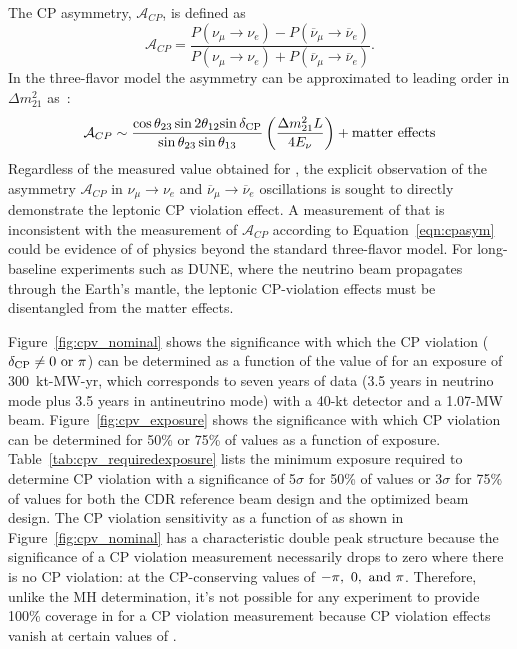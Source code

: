 The CP asymmetry,
$\mathcal{A}_{CP}$, is defined as 
\begin{equation}
\label{eqn:cp-asymm}
 \mathcal{A}_{CP} = \frac{P(\nu_\mu \rightarrow \nu_e) -
  P(\overline{\nu}_\mu \rightarrow \overline{\nu}_e)}{P(\nu_\mu \rightarrow
  \nu_e) + P(\overline{\nu}_\mu \rightarrow \overline{\nu}_e)}.
\end{equation}
In the three-flavor model the asymmetry can be approximated to leading
order in $\Delta m_{21}^2$ as~\cite{Marciano:2006uc}:
\begin{equation}
\mathcal{A}_{CP} \sim \frac{\cos \theta_{23} \sin 2 \theta_{12}
  {\sin \mdeltacp}}{\sin \theta_{23} \sin \theta_{13}}
\left(\frac{\Delta m^2_{21} L}{ 4 E_{\nu}}\right) + {\rm matter
  \ effects}
\label{eqn:cpasym}
\end{equation}
Regardless of the measured value obtained for \deltacp, the explicit observation
of the asymmetry $\mathcal{A}_{CP}$ in $\nu_{\mu} \rightarrow \nu_e$ and $\overline{\nu}_{\mu} \rightarrow \overline{\nu}_e$
oscillations is sought to directly demonstrate the
leptonic CP violation effect.  A measurement of \deltacp that is inconsistent with the measurement of $\mathcal{A}_{CP}$
according to Equation~\ref{eqn:cpasym} could be evidence of of physics beyond the standard three-flavor model.
For long-baseline experiments such as DUNE, where the neutrino beam propagates through 
the Earth's mantle, the leptonic CP-violation effects must be disentangled from 
the matter effects.

Figure~\ref{fig:cpv_nominal} shows the significance with which the CP violation ($\mdeltacp \neq 0 \ {\rm or} \ \pi$) can be determined as a function of the value of \deltacp for an exposure of 300~kt-MW-yr, which corresponds to seven years of data (3.5 years in neutrino mode plus 3.5 years in antineutrino mode) with a 40-kt detector and a 1.07-MW beam.  Figure~\ref{fig:cpv_exposure} shows the significance with which CP violation can be determined for 50\% or 75\% of \deltacp values as a function of exposure.  Table~\ref{tab:cpv_requiredexposure} lists the minimum exposure required to determine CP violation with a significance of 5$\sigma$ for 50\% of \deltacp values or 3$\sigma$ for 75\% of \deltacp values for both the CDR reference beam design and the optimized beam design.  The CP violation sensitivity as a function of \deltacp as shown in Figure~\ref{fig:cpv_nominal} has a characteristic double peak structure because the significance of a CP violation measurement necessarily drops to zero where there is no CP violation: at the CP-conserving values of $-\pi,~0,~{\rm and}~\pi$.  Therefore, unlike the MH determination, it's not possible for any experiment to provide 100\% coverage in \deltacp for a CP violation measurement because CP violation effects vanish at certain values of \deltacp.

